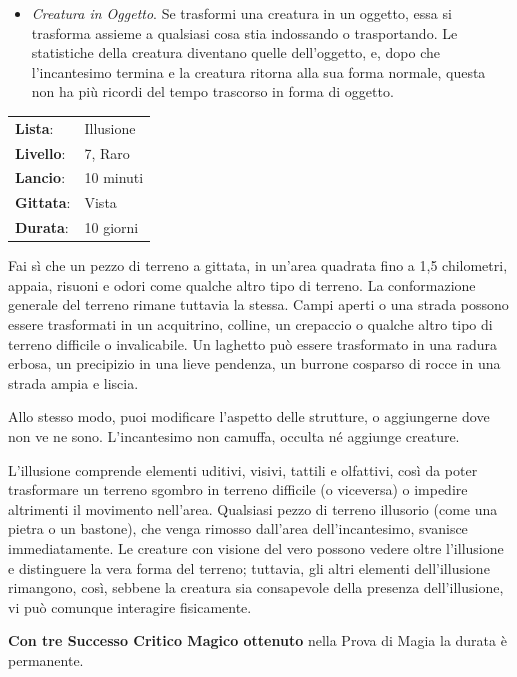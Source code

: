 \begin{multicols}{2}
\begin{itemize}[leftmargin=*]
	\item \emph{Creatura in Oggetto}. Se trasformi una creatura in un oggetto, essa si trasforma assieme a qualsiasi cosa stia indossando o trasportando. Le statistiche della creatura diventano quelle dell'oggetto, e, dopo che l'incantesimo termina e la creatura ritorna alla sua forma normale, questa non ha più ricordi del tempo trascorso in forma di oggetto.

\end{itemize}

\noindent\begin{tabularx}{\linewidth}{p{1.3cm}X}
	\rowcolor{gray!20}\textbf{Lista}: & Illusione \\
	\textbf{Livello}: & 7, Raro \\
	\rowcolor{gray!20}\textbf{Lancio}: & 10 minuti \\
	\textbf{Gittata}: & Vista \\
	\rowcolor{gray!20}\textbf{Durata}: & 10 giorni \\
\end{tabularx}\smallskip

Fai sì che un pezzo di terreno a gittata, in un'area quadrata fino a 1,5 chilometri, appaia, risuoni e odori come qualche altro tipo di terreno. La conformazione generale del terreno rimane tuttavia la stessa. Campi aperti o una strada possono essere trasformati in un acquitrino, colline, un crepaccio o qualche altro tipo di terreno difficile o invalicabile. Un laghetto può essere trasformato in una radura erbosa, un precipizio in una lieve pendenza, un burrone cosparso di rocce in una strada ampia e liscia.

Allo stesso modo, puoi modificare l'aspetto delle strutture, o aggiungerne dove non ve ne sono. L'incantesimo non camuffa, occulta né aggiunge creature.

L'illusione comprende elementi uditivi, visivi, tattili e olfattivi, così da poter trasformare un terreno sgombro in terreno difficile (o viceversa) o impedire altrimenti il movimento nell'area. Qualsiasi pezzo di terreno illusorio (come una pietra o un bastone), che venga rimosso dall'area dell'incantesimo, svanisce immediatamente. Le creature con visione del vero possono vedere oltre l'illusione e distinguere la vera forma del terreno; tuttavia, gli altri elementi dell'illusione rimangono, così, sebbene la creatura sia consapevole della presenza dell'illusione, vi può comunque interagire fisicamente.

\textbf{Con tre Successo Critico Magico ottenuto} nella Prova di Magia la durata è permanente.


\end{multicols}
